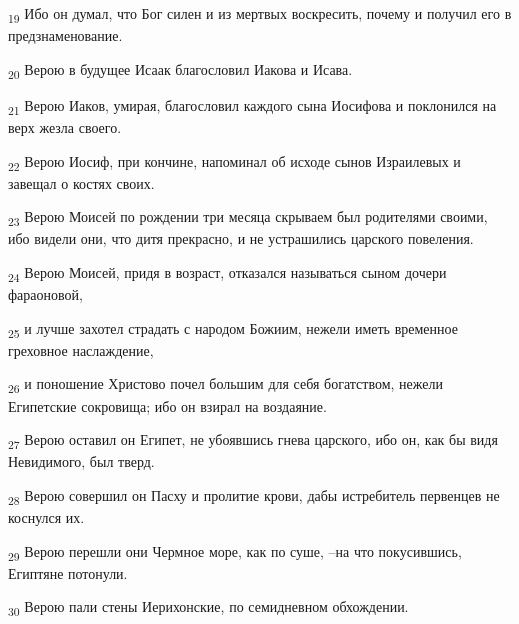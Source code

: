 \begin{tcolorbox}
\textsubscript{19} Ибо он думал, что Бог силен и из мертвых воскресить, почему и получил его в предзнаменование.
\end{tcolorbox}
\begin{tcolorbox}
\textsubscript{20} Верою в будущее Исаак благословил Иакова и Исава.
\end{tcolorbox}
\begin{tcolorbox}
\textsubscript{21} Верою Иаков, умирая, благословил каждого сына Иосифова и поклонился на верх жезла своего.
\end{tcolorbox}
\begin{tcolorbox}
\textsubscript{22} Верою Иосиф, при кончине, напоминал об исходе сынов Израилевых и завещал о костях своих.
\end{tcolorbox}
\begin{tcolorbox}
\textsubscript{23} Верою Моисей по рождении три месяца скрываем был родителями своими, ибо видели они, что дитя прекрасно, и не устрашились царского повеления.
\end{tcolorbox}
\begin{tcolorbox}
\textsubscript{24} Верою Моисей, придя в возраст, отказался называться сыном дочери фараоновой,
\end{tcolorbox}
\begin{tcolorbox}
\textsubscript{25} и лучше захотел страдать с народом Божиим, нежели иметь временное греховное наслаждение,
\end{tcolorbox}
\begin{tcolorbox}
\textsubscript{26} и поношение Христово почел большим для себя богатством, нежели Египетские сокровища; ибо он взирал на воздаяние.
\end{tcolorbox}
\begin{tcolorbox}
\textsubscript{27} Верою оставил он Египет, не убоявшись гнева царского, ибо он, как бы видя Невидимого, был тверд.
\end{tcolorbox}
\begin{tcolorbox}
\textsubscript{28} Верою совершил он Пасху и пролитие крови, дабы истребитель первенцев не коснулся их.
\end{tcolorbox}
\begin{tcolorbox}
\textsubscript{29} Верою перешли они Чермное море, как по суше, --на что покусившись, Египтяне потонули.
\end{tcolorbox}
\begin{tcolorbox}
\textsubscript{30} Верою пали стены Иерихонские, по семидневном обхождении.
\end{tcolorbox}
